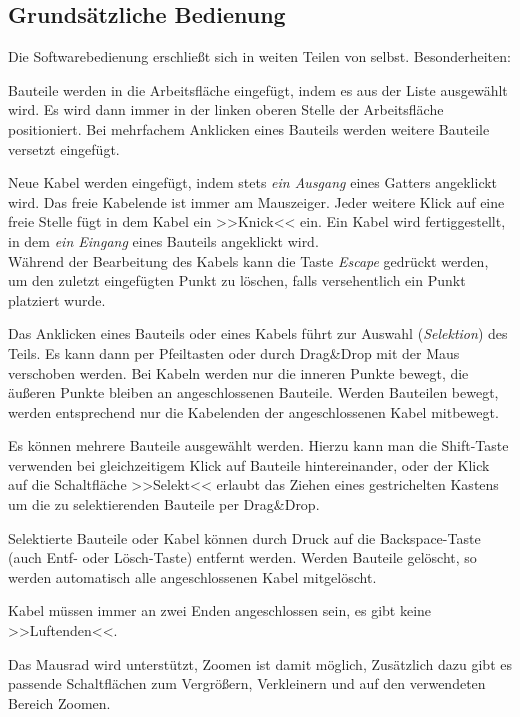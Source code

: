 \documentclass[12pt]{scrartcl}
\begin{document}
\subsection{Grundsätzliche Bedienung}
Die Softwarebedienung erschließt sich in weiten Teilen von selbst. Besonderheiten:
\begin{compactitem}
\item Bauteile werden in die Arbeitsfläche eingefügt, indem es aus der Liste ausgewählt wird. Es wird dann immer in der linken oberen Stelle der Arbeitsfläche positioniert. Bei mehrfachem Anklicken eines Bauteils werden weitere Bauteile versetzt eingefügt.
\item Neue Kabel werden eingefügt, indem stets \textit{ein Ausgang} eines Gatters angeklickt wird. Das freie Kabelende ist immer am Mauszeiger. Jeder weitere Klick auf eine freie Stelle fügt in dem Kabel ein >>Knick<< ein. Ein Kabel wird fertiggestellt, in dem \textit{ein Eingang} eines Bauteils angeklickt wird.\\
Während der Bearbeitung des Kabels kann die Taste \textit{Escape} gedrückt werden, um den zuletzt eingefügten Punkt zu löschen, falls versehentlich ein Punkt platziert wurde.
\item Das Anklicken eines Bauteils oder eines Kabels führt zur Auswahl (\textit{Selektion}) des Teils. Es kann dann per Pfeiltasten oder durch Drag\&Drop mit der Maus verschoben werden. Bei Kabeln werden nur die inneren Punkte bewegt, die äußeren Punkte bleiben an angeschlossenen Bauteile. Werden Bauteilen bewegt, werden entsprechend nur die Kabelenden der angeschlossenen Kabel mitbewegt.
\item Es können mehrere Bauteile ausgewählt werden. Hierzu kann man die Shift-Taste verwenden bei gleichzeitigem Klick auf Bauteile hintereinander, oder der Klick auf die Schaltfläche >>Selekt<< erlaubt das Ziehen eines gestrichelten Kastens um die zu selektierenden Bauteile per Drag\&Drop.
\item Selektierte Bauteile oder Kabel können durch Druck auf die Backspace-Taste (auch Entf- oder Lösch-Taste) entfernt werden. Werden Bauteile gelöscht, so werden automatisch alle angeschlossenen Kabel mitgelöscht.
\item Kabel müssen immer an zwei Enden angeschlossen sein, es gibt keine >>Luftenden<<.
\item Das Mausrad wird unterstützt, Zoomen ist damit möglich, Zusätzlich dazu gibt es passende Schaltflächen zum Vergrößern, Verkleinern und auf den verwendeten Bereich Zoomen.
\end{compactitem}
\end{document}
